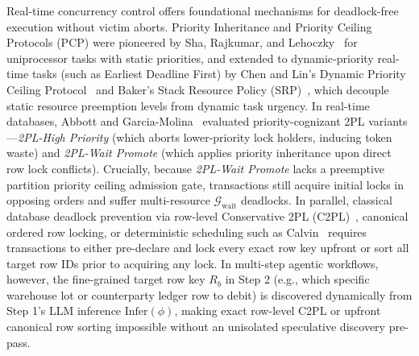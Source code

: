 \documentclass[conference,10pt]{IEEEtran}
\begin{document}
Real-time concurrency control offers foundational mechanisms for deadlock-free execution without victim aborts. Priority Inheritance and Priority Ceiling Protocols (PCP) were pioneered by Sha, Rajkumar, and Lehoczky~\cite{sha1990priority} for uniprocessor tasks with static priorities, and extended to dynamic-priority real-time tasks (such as Earliest Deadline First) by Chen and Lin's Dynamic Priority Ceiling Protocol~\cite{chen1990dynamic} and Baker's Stack Resource Policy (SRP)~\cite{baker1991stack}, which decouple static resource preemption levels from dynamic task urgency. In real-time databases, Abbott and Garcia-Molina~\cite{abbott1992scheduling} evaluated priority-cognizant 2PL variants---\textit{2PL-High Priority} (which aborts lower-priority lock holders, inducing token waste) and \textit{2PL-Wait Promote} (which applies priority inheritance upon direct row lock conflicts). Crucially, because \textit{2PL-Wait Promote} lacks a preemptive partition priority ceiling admission gate, transactions still acquire initial locks in opposing orders and suffer multi-resource $\mathcal{G}_{\text{wait}}$ deadlocks. In parallel, classical database deadlock prevention via row-level Conservative 2PL (C2PL)~\cite{bernstein1987concurrency}, canonical ordered row locking, or deterministic scheduling such as Calvin~\cite{thomson2012calvin} requires transactions to either pre-declare and lock every exact row key upfront or sort all target row IDs prior to acquiring any lock. In multi-step agentic workflows, however, the fine-grained target row key $R_b$ in Step 2 (e.g., which specific warehouse lot or counterparty ledger row to debit) is discovered dynamically from Step 1's LLM inference $\text{Infer}(\phi)$, making exact row-level C2PL or upfront canonical row sorting impossible without an unisolated speculative discovery pre-pass.
\end{document}
